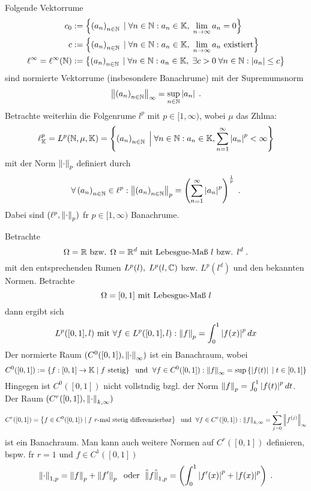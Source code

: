 \begin{ex}
	Folgende Vektorr\as ume 
	\begin{align*}
		 c_0 &:= \left\{\left (a_n\right )_{n\in \mathbb{N}} \;\vert\; \forall n \in\mathbb{N}: a_n \in \mathbb{K}, \; \lim_{n \to \infty} a_n  = 0\right\}\\
		c &:= \left\{\left (a_n\right )_{n\in \mathbb{N}} \;\vert\; \forall n\in \mathbb{N}: a_n \in \mathbb{K}, \; \lim_{n \to \infty} a_n \text{ existiert}\right\}\\
	   \ell^\infty = \ell^\infty(\mathbb{N}) &:= \left\{\left (a_n\right )_{n\in \mathbb{N}} \;\vert\; \forall n\in \mathbb{N}: a_n \in \mathbb{K},\; \exists c>0\;\forall n\in\mathbb{N}: \left\lvert a_n \right\rvert \leq c\right\}
	\end{align*}
	sind normierte Vektorr\as ume (insbesondere Banachr\as ume) mit  der Supremumsnorm 
	\[\left\lVert\left (a_n\right )_{n\in \mathbb{N}}\right\rVert_\infty = \sup_{n\in\mathbb{N}}\left\lvert a_n \right\rvert\;.\]
	Betrachte weiterhin die Folgenr\as ume \(l^p\) mit \(p \in [1,\infty)\), wobei $\mu$ das Z\as hlma\s{}:
	\[\ell_{\mathbb{K}}^p = L^p(\mathbb{N}, \mu,\mathbb{K}) = \left\{\left (a_n\right )_{n\in \mathbb{N}} \;\Big\vert\; \forall n\in \mathbb{N}: a_n \in \mathbb{K}, \sum_{n=1}^\infty \left\lvert a_n \right\rvert^p < \infty\right\}\]
	mit der Norm \(\left\lVert\cdot\right\rVert_{p}\) definiert durch
	\[\forall \left (a_n\right )_{n\in \mathbb{N}} \in \ell^p: \left\lVert\left (a_n\right )_{n\in \mathbb{N}}\right\rVert_{p} = \left(\sum_{n=1}^\infty \left\lvert a_n \right\rvert^p\right)^\frac{1}{p}\;.\]
	Dabei sind \((\ell^p, \left\lVert\cdot\right\rVert_{p})\) f\us r \(p \in [1,\infty)\) Banachr\as ume. 
\end{ex}

\begin{ex}
	\label{norm_fkt_raueme}
	Betrachte
	\[\Omega = \mathbb{R}  \text{ bzw. } \Omega = \mathbb{R}^d\text{ mit Lebesgue-Ma{\ss}{} } l \text{ bzw. } l^d\;.\]
	mit den entsprechenden R\as umen \(L^p(l), \; L^p(l,\mathbb{C})\) bzw. \(L^p(l^d)\) und den bekannten Normen.
	Betrachte 
	\[\Omega = [0,1] \text{ mit Lebesgue-Ma{\ss}{} } l \]
	dann ergibt sich 
	\[L^p([0,1],l) \text{ mit } \forall f\in L^p([0,1],l): \left\lVert f\right\rVert_{p} = \int_0^1 \left\lvert f(x) \right\rvert^p dx\]
	Der normierte Raum \((C^0([0,1]), \left\lVert\cdot\right\rVert_\infty)\) ist ein Banachraum, wobei 
	\[C^0([0,1]) := \left\{f:[0,1]\to\mathbb{K} \;\vert\; f\text{ stetig}\right\} \;\text{ und }\; \forall f \in C^0([0,1]) : \left\lVert f\right\rVert_\infty = \sup\left\{\left\lvert f(t) \right\rvert\;\vert\;t\in[0,1]\right\}\]
	Hingegen ist \(C^0([0,1])\) nicht vollst\as ndig bzgl. der Norm \(\left\lVert f\right\rVert_{p} = \int_0^1\left\lvert f(t) \right\rvert^p dt\).
	Der Raum \((C^r([0,1]), \left\lVert\cdot\right\rVert_{k,\infty})\) 
	\[C^r([0,1]) = \left\{f \in C^0([0,1])\;\vert\; f \text{ $r$-mal stetig differenzierbar}\right\} \;\text{ und }\; \forall f\in C^r([0,1]): \left\lVert f\right\rVert_{k, \infty} = \sum_{j=0}^r \left\lVert f^{(j)}\right\rVert_\infty\]
	 ist ein Banachraum. Man kann auch weitere Normen auf \(C^r([0,1])\) definieren, bspw. f\us r \(r=1\) und \(f\in C^1([0,1])\)
	 \[\left\lVert\cdot\right\rVert_{1,p} = \left\lVert f\right\rVert_{p} + \left\lVert f'\right\rVert_{p} \;\text{ oder }\; \hat\lVert f\hat\rVert_{1,p} = \left(\int_0^1 \left\lvert f'(x) \right\rvert^p + \left\lvert f(x) \right\rvert^p\right)\;.\]
	\end{ex}
	
